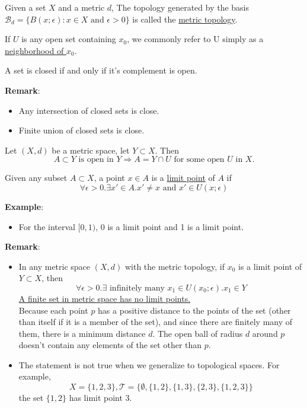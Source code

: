 \begin{definition}
    Given a set $X$ and a metric $d$, The topology generated by the basis $\mathcal{B}_d=\{B(x;\epsilon):x\in X\text{ and }\epsilon>0\}$ is called the \underline{metric topology}.
\end{definition}

\begin{definition}
    If $U$ is any open set containing $x_0$, we commonly refer to U simply as a \underline{neighborhood of $x_0$}.
\end{definition}

\begin{definition}
    A set is closed if and only if it's complement is open.
\end{definition}
\noindent \textbf{Remark}:
\begin{itemize}
    \item Any intersection of closed sets is close.
    \item Finite union of closed sets is close.
\end{itemize}

\begin{lemma}
    Let $(X,d)$ be a metric space, let $Y \subset X$. Then 
    $$A \subset Y \text{ is open in }Y \Longrightarrow A=Y\cap U \text{ for some open }U \text{ in }X.$$
\end{lemma}


\begin{definition}
    Given any subset $A \subset X$, a point $x \in A$ is a \underline{limit point} of $A$ if 
    $$\forall \epsilon >0. \exists x' \in A. x' \neq x \text{ and }x' \in U(x;\epsilon)$$
\end{definition}
\noindent \textbf{Example}:
\begin{itemize}
    \item For the interval $[0,1)$, 0 is a limit point and 1 is a limit point.
\end{itemize}
\noindent \textbf{Remark}:
\begin{itemize}
    \item In any metric space $(X,d)$ with the metric topology, if $x_0$ is a limit point of $Y \subset X$, then
    $$\forall \epsilon >0. \exists \text{ infinitely many }x_1 \in U(x_0;\epsilon). x_1 \in Y$$
    \underline{A finite set in metric space has no limit points.}\\
    Because each point $p$ has a positive distance to the points of the set (other than itself if it is a member of the set), 
    and since there are finitely many of them, there is a minimum distance $d$. The open ball of radius $d$ around $p$ doesn't contain any elements of the set other than $p$.
    \item The statement is not true when we generalize to topological spaces. 
    For example, $$X=\{1,2,3\}, \mathcal{T}=\{\emptyset,\{1,2\},\{1,3\},\{2,3\},\{1,2,3\}\}$$
    the set $\{1,2\}$ has limit point 3.
\end{itemize}

